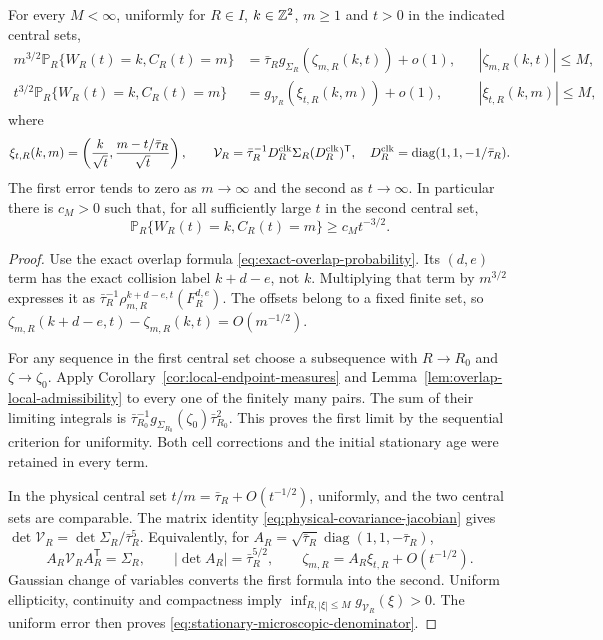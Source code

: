 \begin{theorem}
\label{thm:stationary-microscopic-LLT}
For every $M<\infty$, uniformly for $R\in I$, $k\in\mathbb Z^2$, $m\ge1$
and $t>0$ in the indicated central sets,
\begin{align}
 m^{3/2}\mathbb P_R\{W_R(t)=k,C_R(t)=m\}
 &=\bar\tau_Rg_{\Sigma_R}(\zeta_{m,R}(k,t))+o(1),
           &&|\zeta_{m,R}(k,t)|\le M,
                                      \label{eq:stationary-collision-scale-LLT}\\
 t^{3/2}\mathbb P_R\{W_R(t)=k,C_R(t)=m\}
 &=g_{\mathcal V_R}(\xi_{t,R}(k,m))+o(1),
           &&|\xi_{t,R}(k,m)|\le M,
                                      \label{eq:stationary-physical-scale-LLT}
\end{align}
where
\[
 \xi_{t,R}(k,m)=\left(\frac{k}{\sqrt t},
                       \frac{m-t/\bar\tau_R}{\sqrt t}\right),
 \qquad
 \mathcal V_R=\bar\tau_R^{-1}
 D_R^{\rm clk}\Sigma_R(D_R^{\rm clk})^{\mathsf T},\quad
 D_R^{\rm clk}=\operatorname{diag}(1,1,-1/\bar\tau_R).
\]
The first error tends to zero as $m\to\infty$ and the second as
$t\to\infty$. In particular there is $c_M>0$ such that, for all
sufficiently large $t$ in the second central set,
\begin{equation}\label{eq:stationary-microscopic-denominator}
 \mathbb P_R\{W_R(t)=k,C_R(t)=m\}\ge c_M t^{-3/2}.
\end{equation}
\end{theorem}
\begin{proof}
Use the exact overlap formula
\eqref{eq:exact-overlap-probability}. Its $(d,e)$ term has the exact
collision label $k+d-e$, not $k$. Multiplying that term by $m^{3/2}$
expresses it as $\bar\tau_R^{-1}\rho_{m,R}^{k+d-e,t}(F_R^{d,e})$.
The offsets belong to a fixed finite set, so
$\zeta_{m,R}(k+d-e,t)-\zeta_{m,R}(k,t)=O(m^{-1/2})$.

For any sequence in the first central set choose a subsequence with
$R\to R_0$ and $\zeta\to\zeta_0$. Apply
Corollary~\ref{cor:local-endpoint-measures} and
Lemma~\ref{lem:overlap-local-admissibility} to every one of the
finitely many pairs. The sum of their limiting integrals is
$\bar\tau_{R_0}^{-1}g_{\Sigma_{R_0}}(\zeta_0)\bar\tau_{R_0}^2$.
This proves the first limit by the sequential criterion for uniformity.
Both cell corrections and the initial stationary age were retained
in every term.

In the physical central set $t/m=\bar\tau_R+O(t^{-1/2})$, uniformly,
and the two central sets are comparable. The matrix identity
\eqref{eq:physical-covariance-jacobian} gives
$\det\mathcal V_R=\det\Sigma_R/\bar\tau_R^5$.
Equivalently, for
$A_R=\sqrt{\bar\tau_R}\operatorname{diag}(1,1,-\bar\tau_R)$,
\[
 A_R\mathcal V_RA_R^{\mathsf T}=\Sigma_R,\qquad
 |\det A_R|=\bar\tau_R^{5/2},\qquad
 \zeta_{m,R}=A_R\xi_{t,R}+O(t^{-1/2}).
\]
Gaussian change of variables converts the first formula into the
second. Uniform ellipticity, continuity and compactness imply
$\inf_{R,|\xi|\le M}g_{\mathcal V_R}(\xi)>0$. The uniform error
then proves \eqref{eq:stationary-microscopic-denominator}.
\end{proof}


